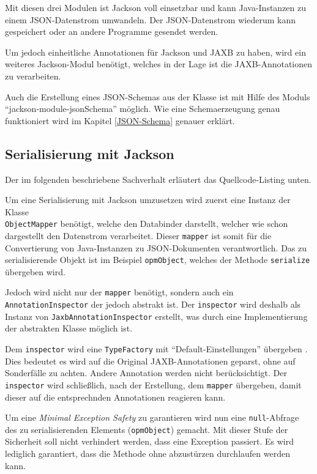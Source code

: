 Mit diesen drei Modulen ist Jackson voll einsetzbar und kann Java-Instanzen zu einem JSON-Datenstrom umwandeln. Der JSON-Datenstrom wiederum kann gespeichert oder an andere Programme gesendet werden.

Um jedoch einheitliche Annotationen f\"ur Jackson und JAXB zu haben, wird ein weiteres Jackson-Modul ben\"otigt, welches in der Lage ist die JAXB-Annotationen zu verarbeiten.

Auch die Erstellung eines JSON-Schemas aus der Klasse ist mit Hilfe des Moduls "`jackson-module-jsonSchema"' m\"oglich. Wie eine Schemaerzeugung genau funktioniert wird im Kapitel \ref{JSON-Schema} genauer erkl\"art. \cite{Jackson}

\subsection{Serialisierung mit Jackson}\label{Serialisierung}
Der im folgenden beschriebene Sachverhalt erl\"autert das Quellcode-Listing unten.

Um eine Serialisierung mit Jackson umzusetzen wird zuerst eine Instanz der Klasse \\\texttt{ObjectMapper} ben\"otigt, welche den Databinder darstellt, welcher wie schon dargestellt den Datenstrom verarbeitet. Dieser \texttt{mapper} ist somit f\"ur die Convertierung von Java-Instanzen zu JSON-Dokumenten verantwortlich. Das zu serialisierende Objekt ist im Beispiel \texttt{opmObject}, welches der Methode \texttt{serialize} \"ubergeben wird.

Jedoch wird nicht nur der \texttt{mapper} ben\"otigt, sondern auch ein \texttt{AnnotationInspector} der jedoch abstrakt ist. Der \texttt{inspector} wird deshalb als Instanz von \texttt{JaxbAnnotationInspector} erstellt, was durch eine Implementierung der abstrakten Klasse m\"oglich ist. 

Dem \texttt{inspector} wird eine \texttt{TypeFactory} mit "`Default-Einstellungen"' \"ubergeben . Dies bedeutet es wird auf die Original JAXB-Annotationen geparst, ohne auf Sonderf\"alle zu achten. Andere Annotation werden nicht ber\"ucksichtigt. Der \texttt{inspector} wird schlie\ss{}lich, nach der Erstellung, dem \texttt{mapper} \"ubergeben, damit dieser auf die entsprechnden Annotationen reagieren kann.

Um eine \textit{Minimal Exception Safety} zu garantieren wird nun eine \texttt{null}-Abfrage des zu serialisierenden Elements (\texttt{opmObject}) gemacht. Mit dieser Stufe der Sicherheit soll nicht verhindert werden, dass eine Exception passiert. Es wird lediglich garantiert, dass die Methode ohne abzust\"urzen durchlaufen werden kann. \cite{ExceptionSafety}

